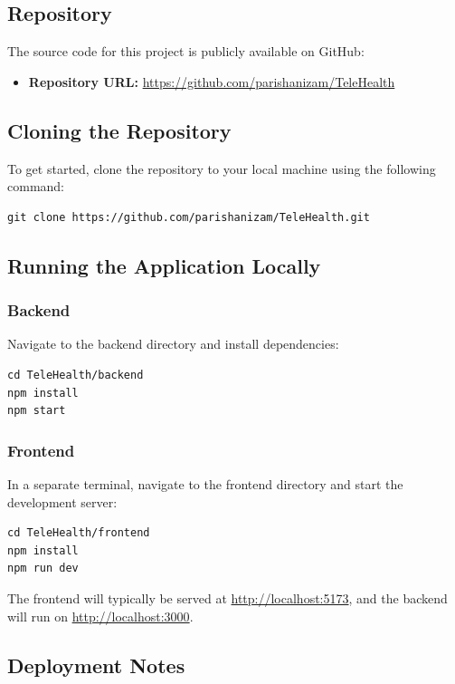 \documentclass{article}
\begin{document}
\subsection{Repository}
The source code for this project is publicly available on GitHub:
\begin{itemize}
    \item \textbf{Repository URL:} \url{https://github.com/parishanizam/TeleHealth}
\end{itemize}

\subsection{Cloning the Repository}
To get started, clone the repository to your local machine using the following command:

\begin{verbatim}
git clone https://github.com/parishanizam/TeleHealth.git
\end{verbatim}

\subsection{Running the Application Locally}

\subsubsection{Backend}
Navigate to the backend directory and install dependencies:

\begin{verbatim}
cd TeleHealth/backend
npm install
npm start
\end{verbatim}

\subsubsection{Frontend}
In a separate terminal, navigate to the frontend directory and start the development server:

\begin{verbatim}
cd TeleHealth/frontend
npm install
npm run dev
\end{verbatim}

The frontend will typically be served at \url{http://localhost:5173}, and the backend will run on \url{http://localhost:3000}.

\subsection{Deployment Notes}
\end{document}
